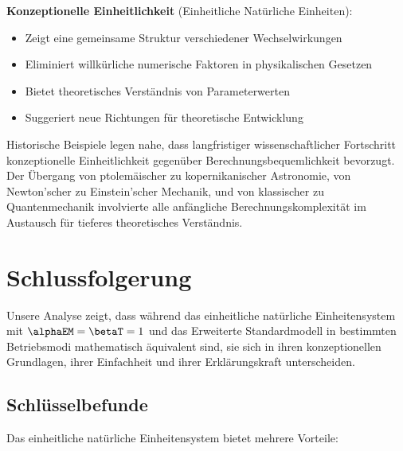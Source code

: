 	\textbf{Konzeptionelle Einheitlichkeit} (Einheitliche Natürliche Einheiten):
	\begin{itemize}
		\item Zeigt eine gemeinsame Struktur verschiedener Wechselwirkungen
		\item Eliminiert willkürliche numerische Faktoren in physikalischen Gesetzen
		\item Bietet theoretisches Verständnis von Parameterwerten
		\item Suggeriert neue Richtungen für theoretische Entwicklung
	\end{itemize}
	
	Historische Beispiele legen nahe, dass langfristiger wissenschaftlicher Fortschritt konzeptionelle Einheitlichkeit gegenüber Berechnungsbequemlichkeit bevorzugt. Der Übergang von ptolemäischer zu kopernikanischer Astronomie, von Newton'scher zu Einstein'scher Mechanik, und von klassischer zu Quantenmechanik involvierte alle anfängliche Berechnungskomplexität im Austausch für tieferes theoretisches Verständnis.
	
	\section{Schlussfolgerung}
	\label{sec:conclusion}
	
	Unsere Analyse zeigt, dass während das einheitliche natürliche Einheitensystem mit $\alphaEM = \betaT = 1$ und das Erweiterte Standardmodell in bestimmten Betriebsmodi mathematisch äquivalent sind, sie sich in ihren konzeptionellen Grundlagen, ihrer Einfachheit und ihrer Erklärungskraft unterscheiden.
	
	\subsection{Schlüsselbefunde}
	\label{subsec:key_findings}
	
	Das einheitliche natürliche Einheitensystem bietet mehrere Vorteile:
	
